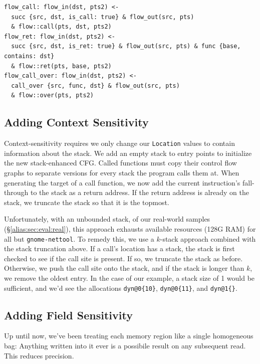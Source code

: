 \begin{lstlisting}[float=*t, caption={Inter-procedural Rules}, label=lst:interrules]
flow_call: flow_in(dst, pts2) <-
  succ {src, dst, is_call: true} & flow_out(src, pts)
  & flow::call(pts, dst, pts2)
flow_ret: flow_in(dst, pts2) <-
  succ {src, dst, is_ret: true} & flow_out(src, pts) & func {base, contains: dst}
  & flow::ret(pts, base, pts2)
flow_call_over: flow_in(dst, pts2) <-
  call_over {src, func, dst} & flow_out(src, pts)
  & flow::over(pts, pts2)
\end{lstlisting}





\subsection{Adding Context Sensitivity}
Context-sensitivity requires we only change our \texttt{Location}
values to contain information about the stack.
We add an empty stack to entry points to initialize the new stack-enhanced CFG.
Called functions must copy their control flow graphs to separate versions for every stack the program calls them at.
When generating the target of a call function, we now add the current instruction's fall-through to the stack as a return address.
If the return address is already on the stack, we truncate the stack so that it is the topmost.

Unfortunately, with an unbounded stack, of our real-world samples (\S \ref{alias:sec:eval:real}), this approach exhausts available resources (128G RAM) for all but \texttt{gnome-nettool}.
To remedy this, we use a $k$-stack approach combined with the stack truncation above.
If a call's location has a stack, the stack is first checked to see if the call site is present.
If so, we truncate the stack as before.
Otherwise, we push the call site onto the stack, and if the stack is longer than $k$, we remove the oldest entry.
In the case of our example, a stack size of 1 would be sufficient, and we'd see the allocations \texttt{dyn@0\{10\}}, \texttt{dyn@0\{11\}}, and \texttt{dyn@1\{\}}.

\subsection{Adding Field Sensitivity}
\label{sec:field}
Up until now, we've been treating each memory region like a single homogeneous bag:
Anything written into it ever is a possibile result on any subsequent read.
This reduces precision.

